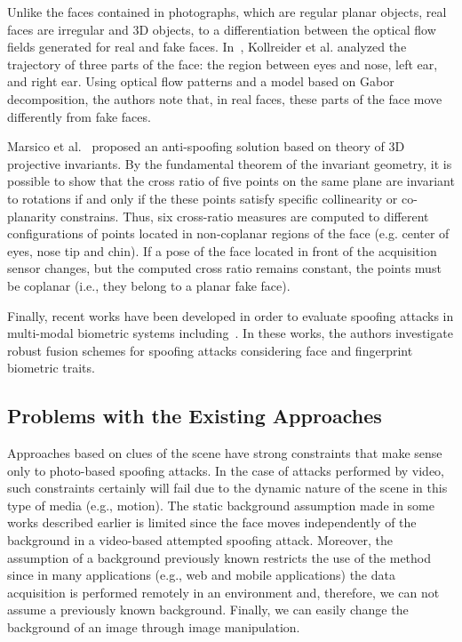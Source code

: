 \documentclass[journal]{IEEEtran}
\providecommand{\rv}[1]{{\protect\color{black}{#1}}}
\begin{document}
Unlike the faces contained in photographs, which are regular planar objects, real faces are irregular and 3D objects, \rv{which lead} to a differentiation between the optical flow fields generated for real and fake faces. In~\cite{Kollreider:IVC:2009}, Kollreider et al. analyzed the trajectory of three parts of the face: the region between eyes and nose, left ear, and right ear. Using optical flow patterns and a model based on Gabor decomposition, the authors note that, in real faces, these parts of the face move differently from fake faces.

Marsico et al.~\cite{Marsico:ICB:2012} proposed an anti-spoofing solution based on \rv{the} theory of 3D projective invariants. By the fundamental theorem of the invariant geometry, it is possible to show that the cross ratio of five points on the same plane are invariant to rotations if and only if the these points satisfy specific collinearity or co-planarity constrains. Thus, six cross-ratio measures are computed to different configurations of points located in non-coplanar regions of the face (e.g. center of eyes, nose tip and chin). If a pose of the face located in front of the acquisition sensor changes, but the computed cross ratio remains constant, the points must be coplanar (i.e., they belong to a planar fake face). 

Finally, recent works have been developed in order to evaluate spoofing attacks in multi-modal biometric systems 
including~\cite{Biggio:IJCB:2011, Marasco:ICMCS:2011, Akhtar:ICIAP:2011, Akhtar:BTAS:2012, Biggio:IET:2012}.
In these works, the authors investigate robust fusion schemes for spoofing attacks considering face and fingerprint biometric traits.

\subsection{Problems with the Existing Approaches}

Approaches based on clues of the scene have strong constraints that make sense only to photo-based spoofing attacks. In the case of attacks performed by video, such constraints certainly will fail due to the dynamic nature of the scene in this type of media (e.g., motion). The static background assumption made in some works described earlier is limited since the face moves independently of the background in a video-based attempted spoofing attack. Moreover, the assumption of a background previously known restricts the use of the method since in many applications (e.g., web and mobile applications) the data acquisition is performed remotely in an environment and, therefore, we can not assume a previously known background. Finally, we can easily change the background of an image through image manipulation.
\end{document}
